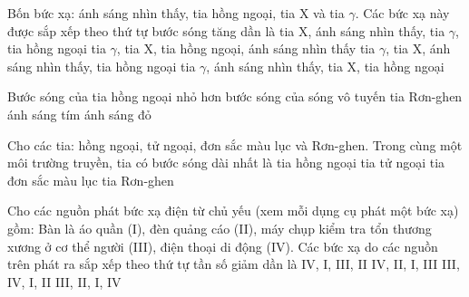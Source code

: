\begin{ex}%
Bốn bức xạ: ánh sáng nhìn thấy, tia hồng ngoại, tia X và tia $\gamma$. Các bức xạ này được sắp xếp theo thứ tự bước sóng tăng dần là
\choice
{tia X, ánh sáng nhìn thấy, tia $\gamma $, tia hồng ngoại}
{tia $\gamma $, tia X, tia hồng ngoại, ánh sáng nhìn thấy}
{\True tia $\gamma $, tia X, ánh sáng nhìn thấy, tia hồng ngoại}
{tia $\gamma $, ánh sáng nhìn thấy, tia X, tia hồng ngoại}
\end{ex} 
\begin{ex}%
Bước sóng của tia hồng ngoại nhỏ hơn bước sóng của
\choice
{\True sóng vô tuyến}
{tia Rơn-ghen}
{ánh sáng tím}
{ánh sáng đỏ}
\end{ex} 
\begin{ex}%
Cho các tia: hồng ngoại, tử ngoại, đơn sắc màu lục và Rơn-ghen. Trong cùng một môi trường truyền, tia có bước sóng dài nhất là
\choice
{\True tia hồng ngoại}
{tia tử ngoại}
{tia đơn sắc màu lục}
{tia Rơn-ghen}
\end{ex} 
\begin{ex}%
Cho các nguồn phát bức xạ điện từ chủ yếu (xem mỗi dụng cụ phát một bức xạ) gồm: Bàn là áo quần (I), đèn quảng cáo (II), máy chụp kiểm tra tổn thương xương ở cơ thể người (III), điện thoại di động (IV). Các bức xạ do các nguồn trên phát ra sắp xếp theo thứ tự tần số giảm dần là
\choice
{IV, I, III, II}
{IV, II, I, III}
{III, IV, I, II}
{\True III, II, I, IV}
\end{ex} 




















